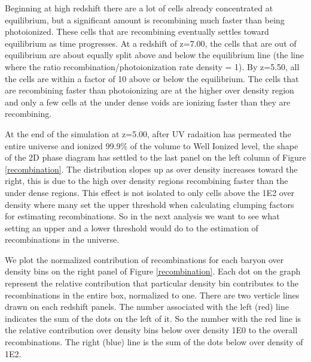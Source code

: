 \documentclass[letterpaper,10pt]{article}
\renewcommand{\(}{\left(}
\renewcommand{\)}{\right)}
\begin{document}

Beginning at high redshift there are a lot of cells already concentrated at equilibrium, but a significant amount is recombining much faster than being photoionized.  These cells that are recombining eventually settles toward equilibrium as time progresses.  At a redshift of z=7.00, the cells that are out of equilibrium  are about equally split above and below the equilibrium line (the line where the ratio recombination/photoionization rate density = 1).  By z=5.50, all the cells are within a factor of 10 above or below the equilibrium.  The cells that are recombining faster than photoionizing are at the higher over density region and only a few cells at the under dense voids are ionizing faster than they are recombining.


At the end of the simulation at z=5.00, after UV radaition has permeated the entire universe and ionized 99.9\% of the volume to Well Ionized level, the shape of the 2D phase diagram has settled to the last panel on the left column of Figure \ref{recombination}.  The distribution slopes up as over density increases toward the right, this is due to the high over density regions recombining faster than the under dense regions.  This effect is not isolated to only cells above the 1E2 over density where many set the upper threshold when calculating clumping factors for estimating recombinations.  So in the next analysis we want to see what setting an upper and a lower threshold would do to the estimation of recombinations in the universe.




We plot the normalized contribution of recombinations for each baryon over density bins on the right panel of Figure \ref{recombination}.  Each dot on the graph represent the relative contribution that particular density bin contributes to the recombinations in the entire box, normalized to one.  There are two verticle lines drawn on each redshift panels.  The number associated with the left (red) line indicates the sum of the dots on the left of it.  So the number with the red line is the relative contribution over density bins below over density 1E0 to the overall recombinations.  The right (blue) line is the sum of the dots below over density of 1E2.
\end{document}
